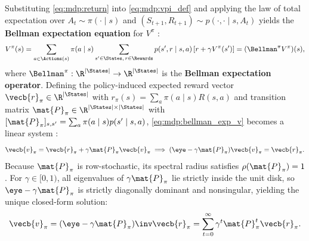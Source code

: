 \documentclass[../../../../master.tex]{subfiles}
\begin{document}
\begin{coremath}
Substituting \eqref{eq:mdp:return} into \eqref{eq:mdp:vpi_def} and applying the law of total expectation over $A_t \sim \pi(\cdot \mid s)$ and $(S_{t+1}, R_{t+1}) \sim p(\cdot, \cdot \mid s, A_t)$ yields the \textbf{Bellman expectation equation} for $V^\pi$ :
\begin{equation}\label{eq:mdp:bellman_exp_v}
  V^\pi(s) = \sum_{a \in \Actions(s)} \pi(a \mid s) \sum_{s' \in \States,\, r \in \Rewards} p(s', r \mid s, a)\left[r + \gamma V^\pi(s')\right] = (\Bellman^\pi V^\pi)(s),
\end{equation}
where $\Bellman^\pi : \R^{|\States|} \to \R^{|\States|}$ is the \textbf{Bellman expectation operator}. Defining the policy-induced expected reward vector $\vecb{r}_\pi \in \R^{|\States|}$ with $r_\pi(s) = \sum_a \pi(a \mid s) R(s, a)$ and transition matrix $\mat{P}_\pi \in \R^{|\States| \times |\States|}$ with $[\mat{P}_\pi]_{s, s'} = \sum_a \pi(a \mid s) p(s' \mid s, a)$, \eqref{eq:mdp:bellman_exp_v} becomes a linear system :
\begin{equation}\label{eq:mdp:bellman_matrix}
  \vecb{v}_\pi = \vecb{r}_\pi + \gamma \mat{P}_\pi \vecb{v}_\pi \implies (\eye - \gamma \mat{P}_\pi)\vecb{v}_\pi = \vecb{r}_\pi.
\end{equation}
Because $\mat{P}_\pi$ is row-stochastic, its spectral radius satisfies $\rho(\mat{P}_\pi) = 1$. For $\gamma \in [0, 1)$, all eigenvalues of $\gamma \mat{P}_\pi$ lie strictly inside the unit disk, so $\eye - \gamma \mat{P}_\pi$ is strictly diagonally dominant and nonsingular, yielding the unique closed-form solution:
\begin{equation}\label{eq:mdp:neumann}
  \vecb{v}_\pi = (\eye - \gamma \mat{P}_\pi)\inv \vecb{r}_\pi = \sum_{t=0}^{\infty} \gamma^t \mat{P}_\pi^t \vecb{r}_\pi.
\end{equation}
\end{coremath}
\end{document}
